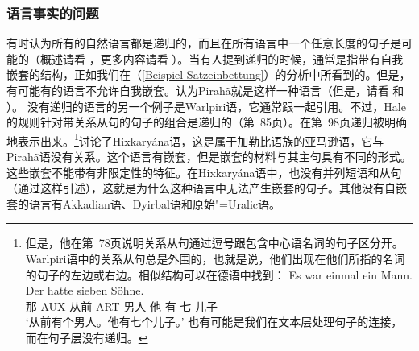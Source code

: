 \subsubsection{语言事实的问题}

\addlines
有时认为所有的自然语言都是递归的，而且在所有语言中一个任意长度的句子是可能的（概述请看\citealp*[]{HNG2005a} ，更多内容请看 ）。当有人提到递归的时候，通常是指带有自我嵌套的结构，正如我们在（\ref{Beispiel-Satzeinbettung}）的分析中所看到的\citep{Fitch2010a}。但是，有可能有的语言不允许自我嵌套。\citet{Everett2005a-u}认为Pirah{\~a}就是这样一种语言（但是，请看 和
）。
没有递归的语言的另一个例子是Warlpiri语，它通常跟一起引用。不过，Hale的规则针对带关系从句的句子的组合是递归的（第~85页）。在第~98页递归被明确地表示出来。\footnote{%
但是，他在第~78页说明关系从句通过逗号跟包含中心语名词的句子区分开。Warlpiri语中的关系从句总是外围的，也就是说，他们出现在他们所指的名词的句子的左边或右边。相似结构可以在德语中找到：
\ea
\gll Es war einmal ein Mann. Der hatte sieben Söhne.\\
	 那 AUX  从前 ART 男人 他 有 七 儿子\\
\glt `从前有个男人。他有七个儿子。'
\z
也有可能是我们在文本层处理句子的连接，而在句子层没有递归。
}\citet[]{PS2010a}讨论了Hixkaryána语，这是属于加勒比语族的亚马逊语，它与Pirah{\~a}语没有关系。这个语言有嵌套，但是嵌套的材料与其主句具有不同的形式。这些嵌套不能带有非限定性的特征。在Hixkaryána语中，也没有并列短语和从句（通过这样引述），这就是为什么这种语言中无法产生嵌套的句子。其他没有自嵌套的语言有Akkadian语、Dyirbal语和原始"=Uralic语。
